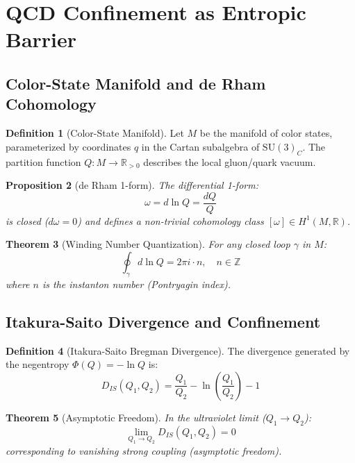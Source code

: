 \documentclass[12pt,a4paper]{article}
\newtheorem{theorem}{Theorem}[section]
\newtheorem{proposition}[theorem]{Proposition}
\theoremstyle{definition}
\newtheorem{definition}[theorem]{Definition}
\theoremstyle{axiom}
\begin{document}
\newpage

\section{QCD Confinement as Entropic Barrier}

\subsection{Color-State Manifold and de Rham Cohomology}

\begin{definition}[Color-State Manifold]
Let $M$ be the manifold of color states, parameterized by coordinates $q$ in the Cartan subalgebra of $\text{SU}(3)_C$. The partition function $Q: M \to \mathbb{R}_{>0}$ describes the local gluon/quark vacuum.
\end{definition}

\begin{proposition}[de Rham 1-form]
The differential 1-form:
\begin{equation}
\omega = d \ln Q = \frac{dQ}{Q}
\end{equation}
is closed ($d\omega = 0$) and defines a non-trivial cohomology class $[\omega] \in H^1(M, \mathbb{R})$.
\end{proposition}

\begin{theorem}[Winding Number Quantization]
For any closed loop $\gamma$ in $M$:
\begin{equation}
\oint_\gamma d \ln Q = 2\pi i \cdot n, \quad n \in \mathbb{Z}
\end{equation}
where $n$ is the instanton number (Pontryagin index).
\end{theorem}

\subsection{Itakura-Saito Divergence and Confinement}

\begin{definition}[Itakura-Saito Bregman Divergence]
The divergence generated by the negentropy $\Phi(Q) = -\ln Q$ is:
\begin{equation}
D_{IS}(Q_1, Q_2) = \frac{Q_1}{Q_2} - \ln\left(\frac{Q_1}{Q_2}\right) - 1
\end{equation}
\end{definition}

\begin{theorem}[Asymptotic Freedom]\label{thm:asymptotic_freedom}
In the ultraviolet limit ($Q_1 \to Q_2$):
\begin{equation}
\lim_{Q_1 \to Q_2} D_{IS}(Q_1, Q_2) = 0
\end{equation}
corresponding to vanishing strong coupling (asymptotic freedom).
\end{theorem}
\end{document}
